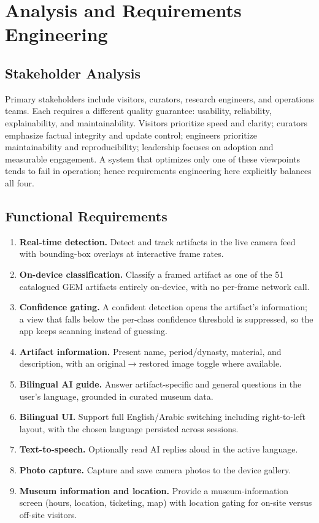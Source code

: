 \chapter{Analysis and Requirements Engineering}

\section{Stakeholder Analysis}

Primary stakeholders include visitors, curators, research engineers, and operations
teams. Each requires a different quality guarantee: usability, reliability,
explainability, and maintainability. Visitors prioritize speed and clarity; curators
emphasize factual integrity and update control; engineers prioritize maintainability
and reproducibility; leadership focuses on adoption and measurable engagement. A
system that optimizes only one of these viewpoints tends to fail in operation; hence
requirements engineering here explicitly balances all four.

\section{Functional Requirements}

\begin{enumerate}[label=\textbf{FR-\arabic*.},leftmargin=3em]
  \item \textbf{Real-time detection.} Detect and track artifacts in the live camera
        feed with bounding-box overlays at interactive frame rates.
  \item \textbf{On-device classification.} Classify a framed artifact as one of the
        51 catalogued GEM artifacts entirely on-device, with no per-frame network call.
  \item \textbf{Confidence gating.} A confident detection opens the artifact's
        information; a view that falls below the per-class confidence threshold is
        suppressed, so the app keeps scanning instead of guessing.
  \item \textbf{Artifact information.} Present name, period/dynasty, material, and
        description, with an original$\rightarrow$restored image toggle where available.
  \item \textbf{Bilingual AI guide.} Answer artifact-specific and general questions in
        the user's language, grounded in curated museum data.
  \item \textbf{Bilingual UI.} Support full English/Arabic switching including
        right-to-left layout, with the chosen language persisted across sessions.
  \item \textbf{Text-to-speech.} Optionally read AI replies aloud in the active language.
  \item \textbf{Photo capture.} Capture and save camera photos to the device gallery.
  \item \textbf{Museum information and location.} Provide a museum-information screen
        (hours, location, ticketing, map) with location gating for on-site versus
        off-site visitors.
\end{enumerate}

